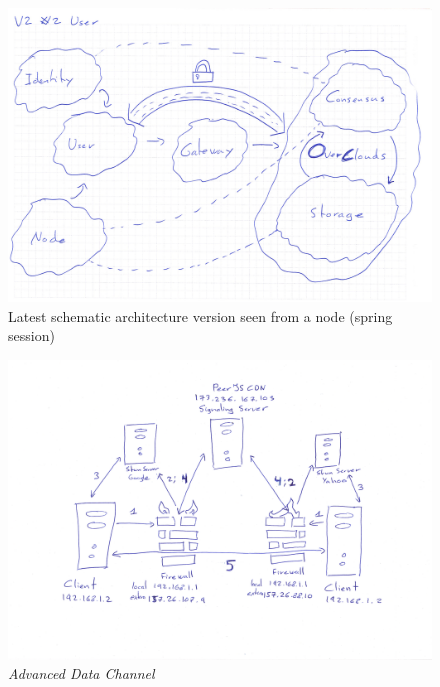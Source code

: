 \begin{figure}[htpb]
\centering
\begin{adjustbox}{center}
\includegraphics[scale=0.7]{annexes/concepts/oc-concept-draft-global-view-idea-2-ss.jpeg}
\end{adjustbox}
\caption{Latest schematic architecture version seen from a node (spring session)
\label{fig:oc-schematic-latest-architecture-node-ss}} 
\end{figure}

\begin{figure}[htpb]
\centering
\begin{adjustbox}{center}
\includegraphics[scale=0.1]{annexes/schemes/signaling-advanced.jpg}
\end{adjustbox}
\caption{\small \sl Advanced Data Channel
\label{fig:signaling-advanced}}
\end{figure}

